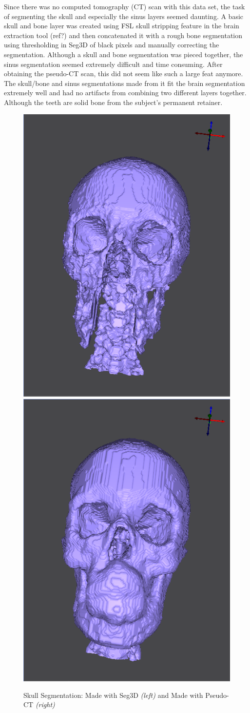 Since there was no computed tomography (CT) scan with this data set, the task of segmenting the skull and especially the sinus layers seemed daunting. A basic skull and bone layer was created using FSL skull stripping feature in the brain extraction tool (ref?) and then concatenated it with a rough bone segmentation using thresholding in Seg3D of black pixels and manually correcting the segmentation. Although a skull and bone segmentation was pieced together, the sinus segmentation seemed extremely difficult and time consuming. After obtaining the pseudo-CT scan, this did not seem like such a large feat anymore. The skull/bone and sinus segmentations made from it fit the brain segmentation extremely well and had no artifacts from combining two different layers together. Although the teeth are solid bone from the subject's permanent retainer.

\begin{figure}[H]
\begin{center}
\includegraphics[width=.49\textwidth]{Figures/skull_before}
\includegraphics[width=.49\textwidth]{Figures/skull_after}
\caption{Skull Segmentation: Made with Seg3D \textit{(left)} and Made with Pseudo-CT \textit{(right)}}
\label{fig:skull}
\end{center}
\end{figure}


